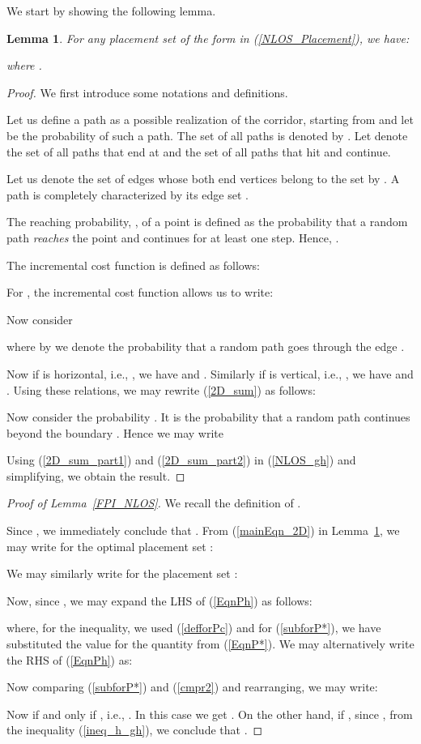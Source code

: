 \documentclass[conference]{IEEEtran}
\newtheorem{lemma}{Lemma}
\begin{document}
We start by showing the following lemma. 
\begin{lemma} \label{g_h_Eqn}
For \emph{any} placement set  of the form in (\ref{NLOS_Placement}), we have:

where .
\end{lemma}
\begin{proof}
We first introduce some notations and definitions.

Let us define a path  as a possible realization of the corridor, starting from  and let  be the probability of such a path. The set of all paths is denoted by . Let  denote the set of all paths that end at  and  the set of all paths that hit  and continue. 

Let us denote the set of edges whose both end vertices belong to the set  by . A path  is completely characterized by its edge set .

The reaching probability, , of a point  is defined as the probability that a random path  \emph{reaches} the point  and continues for at least one step. Hence, .

The incremental cost function   is defined as follows:


For , the incremental cost function allows us to write:

Now consider 

where by  we denote the probability that a random path goes through the edge .

Now if  is horizontal, i.e., , we have  and . Similarly if  is vertical, i.e., , we have  and . Using these relations, we may rewrite (\ref{2D_sum}) as follows:


Now consider the probability . It is the probability that a random path continues beyond the boundary . Hence we may write

Using (\ref{2D_sum_part1}) and (\ref{2D_sum_part2}) in (\ref{NLOS_gh}) and simplifying, we obtain the result. 
\end{proof}


\begin{proof}[Proof of Lemma~\ref{FPI_NLOS}]

We recall the definition of . 

Since , we immediately conclude that . From (\ref{mainEqn_2D}) in Lemma~\ref{g_h_Eqn}, we may write for the optimal placement set :

We may similarly write for the placement set :

Now, since , we may expand the LHS of (\ref{EqnPh}) as follows:

where, for the inequality, we used (\ref{defforPc}) and for (\ref{subforP*}), we have substituted the value for the quantity from (\ref{EqnP*}).
We may alternatively write the RHS of (\ref{EqnPh}) as:

Now comparing (\ref{subforP*}) and (\ref{cmpr2}) and rearranging, we may write:

Now  if and only if , i.e., . In this case we get . 
On the other hand, if , since , from the inequality (\ref{ineq_h_gh}), we conclude that .
\end{proof}
\end{document}
